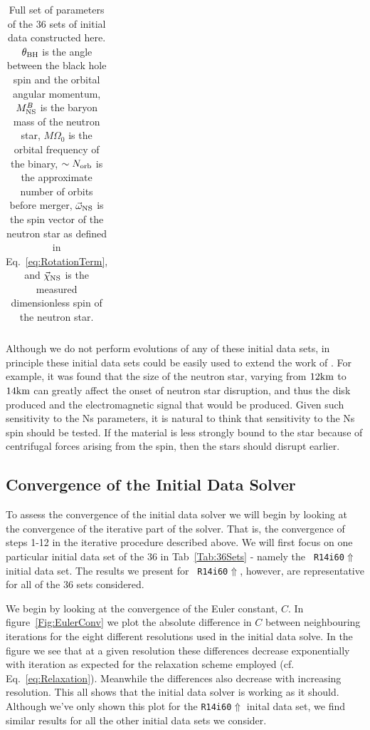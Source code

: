 \begin{longtable}{l|c|c|c|c|c|c}
\caption[Initial data set parameters for series of 36 Bh-Ns initial
data sets.]{\label{tab:FullBHNSParameters}Full set of parameters of
  the 36 sets of initial data constructed here. $\theta_{\rm BH}$ is
  the angle between the black hole spin and the orbital angular
  momentum, $M^B_{\rm NS}$ is the baryon mass of the neutron star,
  $M\Omega_0$ is the orbital frequency of the binary, $\sim N_{\rm
    orb}$ is the approximate number of orbits before merger,
  $\vec{\omega}_{\rm NS}$ is the spin vector of the neutron star as
  defined in Eq.~\ref{eq:RotationTerm}, and $\vec{\chi}_{\rm NS}$ is
  the measured dimensionless spin of the neutron star.}
\end{longtable}

Although we do not perform evolutions of any of these initial data sets, in principle these initial data sets could be easily used to
extend the work of \cite{Foucart:2013a}. For example, it was found
that the size of the neutron star, varying from $12{\rm km}$ to $14{\rm km}$ can
greatly affect the onset of neutron star disruption, and thus the disk
produced and the electromagnetic signal that would be produced. Given
such sensitivity to the Ns parameters, it is natural to think that
sensitivity to the Ns spin should be tested. If the material is less
strongly bound to the star because of centrifugal forces arising from
the spin, then the stars should disrupt earlier.

\subsection{Convergence of the Initial Data Solver}
To assess the convergence of the initial data solver we will begin by looking at the convergence of the iterative part of the solver. That is, the convergence of steps 1-12 in the iterative procedure
described above. We will first focus on one particular initial data
set of the 36 in Tab~\ref{Tab:36Sets} - namely the {\tt
  R14i60$\Uparrow$} initial data set. The results we present for {\tt
  R14i60$\Uparrow$}, however, are representative for all of the 36 sets considered.

We begin by looking at the convergence of the Euler constant, $C$. In figure~\ref{Fig:EulerConv} we plot the absolute difference in $C$ between neighbouring iterations for the eight
different resolutions used in the initial data solve. %
In the figure we see that at a given resolution these differences
decrease exponentially with iteration as expected for the relaxation
scheme employed (cf. Eq.~\ref{eq:Relaxation}). Meanwhile the differences also decrease with increasing resolution. This all shows that the initial data solver is working as it should. Although we've only shown
this plot for the {\tt R14i60$\Uparrow$} inital data set, we find similar results for all the other initial data sets we consider.


